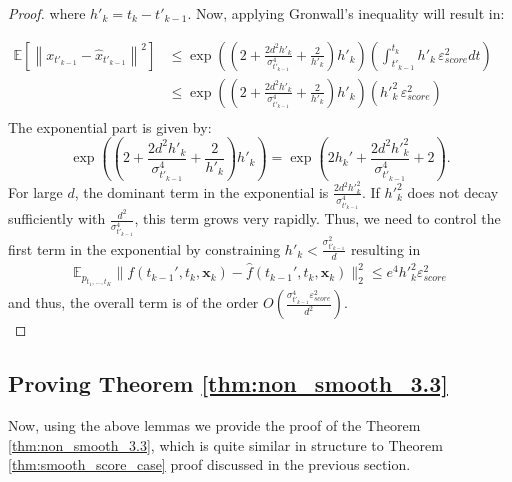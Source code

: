 \documentclass[11pt]{article}
\def\rvx{{\mathbf{x}}}
\newcommand{\E}{\mathbb{E}}
\begin{document}
\begin{proof}
\noindent
where $h'_k = t_k-t'_{k-1}$. Now, applying Gronwall's inequality will result in:

\begin{align*}
\mathbb{E}\left[\left\| x_{t'_{k-1}} - \hat{x}_{t'_{k-1}} \right\|^2\right]
& \leq \exp\left(\left(2 + \frac{2d^2h'_k}{\sigma_{t'_{k-1}}^4} +  \frac{2}{h'_k} \right)h'_k\right)\left(  \int_{t'_{k-1}}^{t_k}  h'_{k}\, \varepsilon^2_{score} dt \right) \quad  \\
&\leq \exp\left(\left(2 + \frac{2d^2h'_k}{\sigma_{t'_{k-1}}^4} +  \frac{2}{h'_k} \right)h'_k\right)\left(    h'^2_{k}\, \varepsilon^2_{score} \right) \quad \\
\end{align*}
The exponential part is given by:
\[
 \exp\left(\left(2 + \frac{2d^2h'_k}{\sigma_{t'_{k-1}}^4} +  \frac{2}{h'_k} \right)h'_k\right) = \exp\left(2h_k' +  \frac{2d^2h'^2_k}{\sigma_{t'_{k-1}}^4} + 2\right).
\]
For large \( d \), the dominant term in the exponential is \( \frac{2d^2h'^2_k}{\sigma_{t'_{k-1}}^4} \). If \( h'^2_k \) does not decay sufficiently with \(\frac{d^2}{\sigma_{t'_{k-1}}^4} \), this term grows very rapidly. Thus, we need to control the first term in the exponential by constraining $h'_k < \frac{\sigma_{t'_{k-1}}^2}{d}$ resulting in
\begin{align}
    \E_{p_{t_1,...,t_K}}  
  \|
  f(t_{k-1}',t_k,{\rvx}_k)-\hat{f}(t_{k-1}',t_k,{\rvx}_k)\|_2^2 \leq e^4 {h'}_k^2\varepsilon^2_{score}
\end{align}
and thus,  the overall term is of the order ${O}(\frac{\sigma_{t'_{k-1}}^4\varepsilon^2_{score}}{d^2})$. \\


\end{proof}





\subsection{Proving Theorem \ref{thm:non_smooth_3.3}} 
\label{proving_thm_3.3}
Now, using the above lemmas we provide the proof of the Theorem \ref{thm:non_smooth_3.3}, which is quite similar in structure to Theorem \ref{thm:smooth_score_case} proof discussed in the previous section. 
\end{document}

